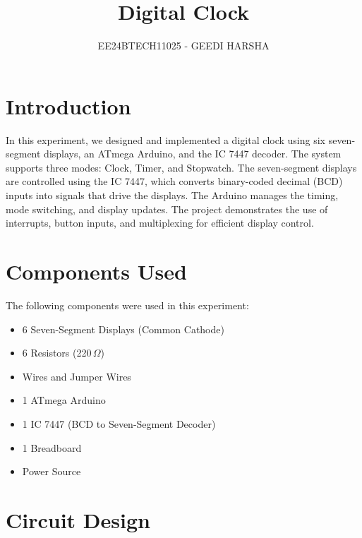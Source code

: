 \documentclass[journal]{IEEEtran}
\begin{document}

\vspace{3cm}
\title{Digital Clock}
\author{EE24BTECH11025 - GEEDI HARSHA}
{\let\newpage\relax\maketitle}

\renewcommand{\thefigure}{\theenumi}
\renewcommand{\thetable}{\theenumi}
\setlength{\intextsep}{10pt} %


\renewcommand{\thetable}{\theenumi}

\section{Introduction}
In this experiment, we designed and implemented a digital clock using six seven-segment displays, an ATmega Arduino, and the IC 7447 decoder. The system supports three modes: Clock, Timer, and Stopwatch. The seven-segment displays are controlled using the IC 7447, which converts binary-coded decimal (BCD) inputs into signals that drive the displays. The Arduino manages the timing, mode switching, and display updates. The project demonstrates the use of interrupts, button inputs, and multiplexing for efficient display control.

\section{Components Used}
The following components were used in this experiment:
\begin{itemize}
    \item 6 Seven-Segment Displays (Common Cathode)
    \item 6 Resistors (220\,$\Omega$)
    \item Wires and Jumper Wires
    \item 1 ATmega Arduino
    \item 1 IC 7447 (BCD to Seven-Segment Decoder)
    \item 1 Breadboard
    \item Power Source 
\end{itemize}


\section{Circuit Design}
\end{document}
